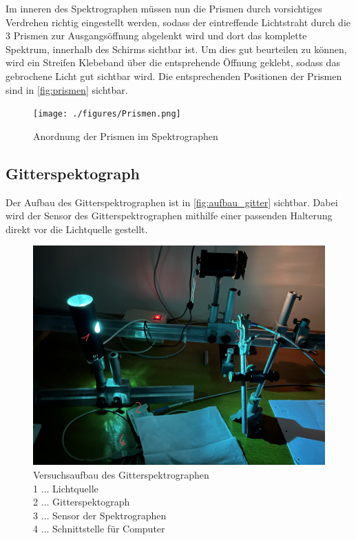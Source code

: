 \documentclass[12pt,english,ngerman]{scrartcl}
\begin{document}
Im inneren des Spektrographen müssen nun die Prismen durch vorsichtiges
Verdrehen richtig eingestellt werden, sodass der eintreffende Lichtstraht durch
die 3 Prismen zur Ausgangsöffnung abgelenkt wird und dort das komplette
Spektrum, innerhalb des Schirms sichtbar ist. Um dies gut beurteilen zu können,
wird ein Streifen Klebeband über die entsprehende Öffnung geklebt, sodass das
gebrochene Licht gut sichtbar wird. Die entsprechenden Positionen der Prismen
sind in \autoref{fig:prismen} sichtbar.

\begin{figure}[H]
	\begin{center}
		\texttt{[image: ./figures/Prismen.png]}
	\end{center}
	\caption[Anordnung der Prismen im Spektrographen] {Anordnung der Prismen im
		Spektrographen
	}\label{fig:prismen}
\end{figure}

\subsection{Gitterspektograph}

Der Aufbau des Gitterspektrographen ist in \autoref{fig:aufbau_gitter}
sichtbar. Dabei wird der Sensor des Gitterspektrographen mithilfe einer
passenden Halterung direkt vor die Lichtquelle gestellt.
\begin{figure}[H]
	\begin{center}
		\includegraphics[width =\textwidth]{./figures/Gitterspektograph.png}
	\end{center}
	\caption[Versuchsaufbau des Gitterspektrographen] {Versuchsaufbau des
		Gitterspektrographen                  \\
		1 \(\dots\) Lichtquelle               \\
		2 \(\dots\) Gitterspektograph         \\
		3 \(\dots\) Sensor der Spektrographen \\
		4 \(\dots\) Schnittstelle für Computer
	}\label{fig:aufbau_gitter}
\end{figure}
\end{document}
